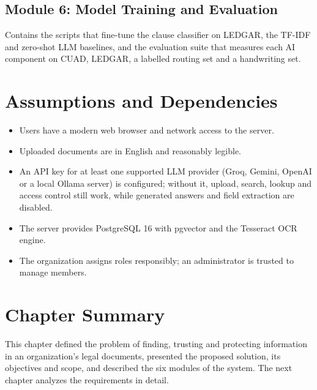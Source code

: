 \subsection{Module 6: Model Training and Evaluation}
Contains the scripts that fine-tune the clause classifier on LEDGAR, the TF-IDF and zero-shot LLM
baselines, and the evaluation suite that measures each AI component on CUAD, LEDGAR, a labelled
routing set and a handwriting set.

\section{Assumptions and Dependencies}
\begin{itemize}
\item Users have a modern web browser and network access to the server.
\item Uploaded documents are in English and reasonably legible.
\item An API key for at least one supported LLM provider (Groq, Gemini, OpenAI or a local Ollama server)
is configured; without it, upload, search, lookup and access control still work, while generated
answers and field extraction are disabled.
\item The server provides PostgreSQL 16 with pgvector and the Tesseract OCR engine.
\item The organization assigns roles responsibly; an administrator is trusted to manage members.
\end{itemize}

\section{Chapter Summary}
This chapter defined the problem of finding, trusting and protecting information in an organization's
legal documents, presented the proposed solution, its objectives and scope, and described the six
modules of the system. The next chapter analyzes the requirements in detail.
